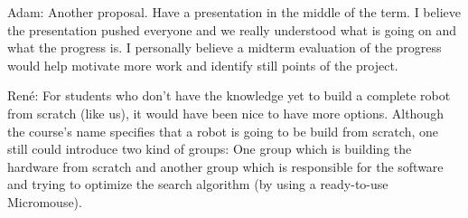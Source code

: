 Adam: Another proposal. Have a presentation in the middle of the term. I believe the presentation pushed everyone and we really understood what is going on and what the progress is. I personally believe a midterm evaluation of the progress would help motivate more work and identify still points of the project.

René: For students who don't have the knowledge yet to build a complete robot from scratch (like us), it would have been nice to have more options. Although the course's name specifies that a robot is going to be build from scratch, one still could introduce two kind of groups: One group which is building the hardware from scratch and another group which is responsible for the software and trying to optimize the search algorithm (by using a ready-to-use Micromouse).